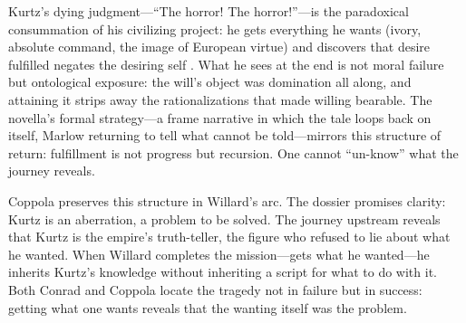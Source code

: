 Kurtz's dying judgment---``The horror! The horror!''---is the paradoxical consummation of his
civilizing project: he gets everything he wants (ivory, absolute command, the image of European
virtue) and discovers that desire fulfilled negates the desiring self \parencite{ConradHOD1990}.
What he sees at the end is not moral failure but ontological exposure: the will's object was
domination all along, and attaining it strips away the rationalizations that made willing
bearable. The novella's formal strategy---a frame narrative in which the tale loops back on
itself, Marlow returning to tell what cannot be told—mirrors this structure of return:
fulfillment is not progress but recursion. One cannot ``un-know'' what the journey reveals.

Coppola preserves this structure in Willard's arc. The dossier promises clarity: Kurtz is an
aberration, a problem to be solved. The journey upstream reveals that Kurtz is the empire's
truth-teller, the figure who refused to lie about what he wanted. When Willard completes the
mission—gets what he wanted—he inherits Kurtz's knowledge without inheriting a script for what
to do with it. Both Conrad and Coppola locate the tragedy not in failure but in success:
getting what one wants reveals that the wanting itself was the problem.
